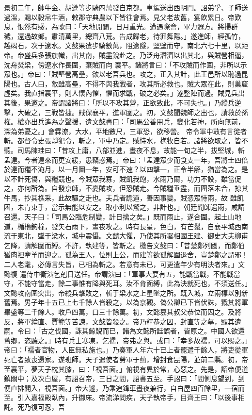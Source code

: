 \begin{pinyinscope}
 景初二年，帥牛金、胡遵等步騎四萬發自京都。車駕送出西明門。詔弟孚、子師送過溫，賜以穀帛牛酒，敕郡守典農以下皆往會焉。見父老故舊，宴飲累日。帝歎息，悵然有感，為歌曰：「天地開闢，日月重光。遭遇際會，畢力遐方。將掃群穢，還過故鄉。肅清萬里，總齊八荒。告成歸老，待罪舞陽。」遂進師，經孤竹，越碣石，次于遼水。文懿果遣步騎數萬，阻遼隧，堅壁而守，南北六七十里，以距帝。帝盛兵多張旗幟，出其南，賊盡銳赴之。乃泛舟潛濟以出其北，與賊營相逼，沈舟焚梁，傍遼水作長圍，棄賊而向
 襄平。諸將言曰：「不攻賊而作圍，非所以示眾也。」帝曰：「賊堅營高壘，欲以老吾兵也。攻之，正入其計，此王邑所以恥過昆陽也。古人曰，敵雖高壘，不得不與我戰者，攻其所必救也。賊大眾在此，則巢窟虛矣。我直指襄平，則人懷內懼，懼而求戰，破之必矣。」遂整陣而過。賊見兵出其後，果邀之。帝謂諸將曰：「所以不攻其營，正欲致此，不可失也。」乃縱兵逆擊，大破之，三戰皆捷。賊保襄平，進軍圍之。初，文懿聞魏師之出也，請救於孫權。權亦出兵遙為之聲援，遺文懿書曰：「司馬公善用兵，變化若神，所向無前，深為弟憂之。」會霖潦，大水，平地數尺，三軍恐，欲移營。
 帝令軍中敢有言徙者斬。都督令史張靜犯令，斬之，軍中乃定。賊恃水，樵牧自若。諸將欲取之，皆不聽。司馬陳珪曰：「昔攻上庸，八部並進，晝夜不息，故能一旬之半，拔堅城，斬孟達。今者遠來而更安緩，愚竊惑焉。」帝曰：「孟達眾少而食支一年，吾將士四倍於達而糧不淹月，以一月圖一年，安可不速？以四擊一，正令半解，猶當為之。是以不計死傷，與糧競也。今賊眾我寡，賊飢我飽，水雨乃爾，功力不設，雖當促之，亦何所為。自發京師，不憂賊攻，但恐賊走。今賊糧垂盡，而圍落未合，掠其牛馬，抄其樵采，此故驅之走也。夫兵者詭道，善因事變。賊憑眾恃雨，故
 雖飢困，未肯束手，當示無能以安之。取小利以驚之，非計也。」朝廷聞師遇雨，咸請召還。天子曰：「司馬公臨危制變，計日擒之矣。」既而雨止，遂合圍。起土山地道，楯櫓鉤橦，發矢石雨下，晝夜攻之。時有長星，色白，有芒鬣，自襄平城西南流于東北，墜于梁水，城中震懾。文懿大懼，乃使其所署相國王建、御史大夫柳甫乞降，請解圍而縛。不許，執建等，皆斬之。檄告文懿曰：「昔楚鄭列國，而鄭伯猶肉袒牽羊而迎之。孤為王人，位則上公，而建等欲孤解圍退舍，豈楚鄭之謂邪！二人老耄，必傳言失旨，已相為斬之。若意有未已，可更遣年少有明決者來。」文懿復
 遣侍中衛演乞剋日送任。帝謂演曰：「軍事大耍有五，能戰當戰，不能戰當守，不能守當走，餘二事惟有降與死耳。汝不肯面縛，此為決就死也，不須送任。」文懿攻南圍突出，帝縱兵擊敗之，斬于梁水之上星墜之所。既入城，立兩標以別新舊焉。男子年十五已上七千餘人皆殺之，以為京觀。偽公卿已下皆伏誅，戮其將軍畢盛等二千餘人。收戶四萬，口三十餘萬。初，文懿篡其叔父恭位而囚之。及將反，將軍綸直、賈範等苦諫，文懿皆殺之。帝乃釋恭之囚，封直等之墓，顯其遺嗣。令曰：「古之伐國，誅其鯨鯢而已，諸為文懿所詿誤者，皆原之。中國人欲還
 舊鄉，恣聽之。」時有兵士寒凍，乞襦，帝弗之與。或曰：「幸多故襦，可以賜之。」帝曰：「襦者官物，人臣無私施也。」乃奏軍人年六十已上者罷遣千餘人，將吏從軍死亡者致喪還家。遂班師。天子遣使者勞軍于薊，增封食昆陽，並前二縣。初，帝至襄平，夢天子枕其膝，曰：「視吾面。」俯視有異於常，心惡之。先是，詔帝便道鎮關中；及次白屋，有詔召帝，三日之間，詔書五至。手詔曰：「間側息望到，到便直排閣入，視吾面。」帝大遽，乃乘追鋒車晝夜兼行，自白屋四百餘里，一宿而至。引入嘉福殿臥內，升御床。帝流涕問疾，天子執帝手，目齊王曰：「以後事相託。死乃復可忍，吾

\end{pinyinscope}
